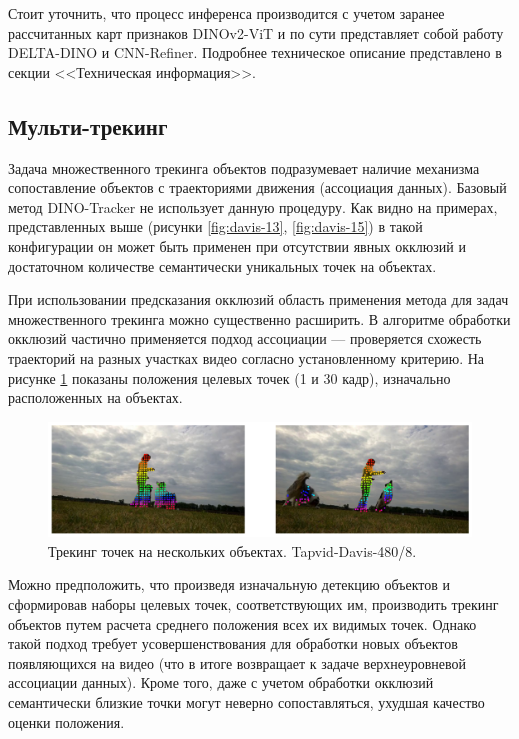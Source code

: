 \documentclass[a4paper, 14pt]{extarticle}
\theoremstyle{definition}
\theoremstyle{plain}
\theoremstyle{remark}
\begin{document}
Стоит уточнить, что процесс инференса производится с учетом заранее рассчитанных карт признаков DINOv2-ViT и по сути представляет собой работу DELTA-DINO и CNN-Refiner. Подробнее техническое описание представлено в секции <<Техническая информация>>.

\subsection{Мульти-трекинг}
Задача множественного трекинга объектов подразумевает наличие механизма сопоставление объектов с траекториями движения (ассоциация данных). Базовый метод DINO-Tracker не использует данную процедуру. Как видно на примерах, представленных выше (рисунки \ref{fig:davis-13}, \ref{fig:davis-15}) в такой конфигурации он может быть применен при отсутствии явных окклюзий и достаточном количестве семантически уникальных точек на объектах.

При использовании предсказания окклюзий область применения метода для задач множественного трекинга можно существенно расширить. В алгоритме обработки окклюзий частично применяется подход ассоциации --- проверяется схожесть траекторий на разных участках видео согласно установленному критерию. На рисунке \ref{fig:davis-8} показаны положения целевых точек (1 и 30 кадр), изначально расположенных на объектах.
\begin{figure}
    [H]
    \centering
    \includegraphics[width=\textwidth]{figs/davis-8.png}
    \caption{Трекинг точек на нескольких объектах. Tapvid-Davis-480/8.}
    \label{fig:davis-8}
\end{figure}

Можно предположить, что произведя изначальную детекцию объектов и сформировав наборы целевых точек, соответствующих им, производить трекинг объектов путем расчета среднего положения всех их видимых точек.
Однако такой подход требует усовершенствования для обработки новых объектов появляющихся на видео (что в итоге возвращает к задаче верхнеуровневой ассоциации данных). Кроме того, даже с учетом обработки окклюзий семантически близкие точки могут неверно сопоставляться, ухудшая качество оценки положения.
\newpage
\end{document}
